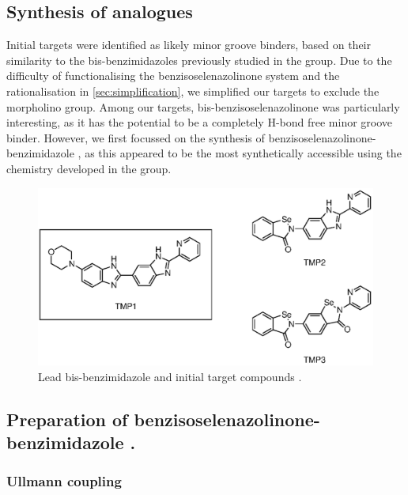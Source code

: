 \begin{refsection}
\section{Synthesis of analogues}
Initial targets  were identified as likely minor groove binders, based on their similarity to the bis-benzimidazoles previously studied in the group.
Due to the difficulty of functionalising the benzisoselenazolinone system and the rationalisation in \cref{sec:simplification}, we simplified our targets to exclude the morpholino group.
Among our targets, bis-benzisoselenazolinone  was particularly interesting, as it has the potential to be a completely H-bond free minor groove binder.
However, we first focussed on the synthesis of benzisoselenazolinone-benzimidazole , as this appeared to be the most synthetically accessible using the chemistry developed in the group.

\begin{figure}
    \centering
    \includegraphics[scale=0.74]{Figures/targets.eps}
    \caption{Lead bis-benzimidazole  and initial target compounds .}\label{fig:targets}
\end{figure}

\subsection{Preparation of benzisoselenazolinone-benzimidazole .}

\subsubsection{Ullmann coupling}\label{sec:carboximidate}


\end{refsection}
